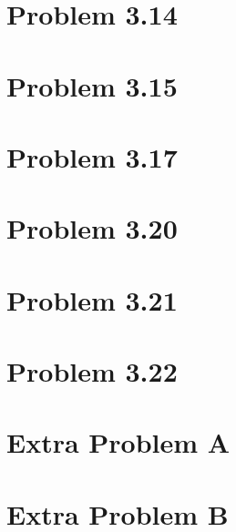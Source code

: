 \documentclass[11pt,a4paper,oneside]{report}
\begin{document}
\section*{Problem 3.14}


\section*{Problem 3.15}


\section*{Problem 3.17}


\section*{Problem 3.20}


\section*{Problem 3.21}


\section*{Problem 3.22}


\section*{Extra Problem A}


\section*{Extra Problem B}
\end{document}
